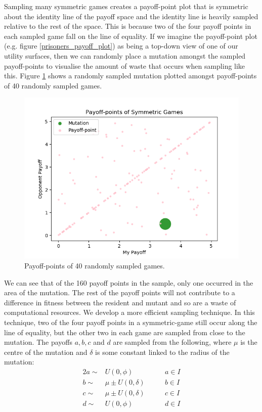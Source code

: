 \documentclass[11pt]{book}
\newcommand*{\np}{\par\noindent\newline}
\begin{document}
\np Sampling many symmetric games creates a payoff-point plot that is symmetric about the identity line of the payoff space and the identity line is heavily sampled relative to the rest of the space.
This is because two of the four payoff points in each sampled game fall on the line of equality.
If we imagine the payoff-point plot (e.g. figure \ref{prisoners_payoff_plot}) as being a top-down view of one of our utility surfaces,
then we can randomly place a mutation amongst the sampled payoff-points to visualise the amount of waste that occurs when sampling like this.
Figure \ref{symmetric_payoff_plot} shows a randomly sampled mutation plotted amongst payoff-points of 40 randomly sampled games.
\begin{figure}
	\centering
	\includegraphics[scale=0.7]{resources/scatter_symmetric_mutation.png}
	\caption{Payoff-points of 40 randomly sampled games.}
	\label{symmetric_payoff_plot}
\end{figure}
We can see that of the 160 payoff points in the sample, only one occurred in the area of the mutation.
The rest of the payoff points will not contribute to a difference in fitness between the resident and mutant and so are a waste of computational resources.
We develop a more efficient sampling technique.
In this technique, two of the four payoff points in a symmetric-game still occur along the line of equality,
but the other two in each game are sampled from close to the mutation.
The payoffs $a, b, c$ and $d$ are sampled from the following, where $\mu$ is the centre of the mutation and $\delta$ is some constant linked to the radius of the mutation:
\begin{alignat*}{2}\label{local_a_through_d}	
	a \sim & U(0,\phi) \qquad & a \in I\\
	b \sim & \mu \pm U(0,\delta) \qquad & b \in I\\
	c \sim & \mu \pm U(0,\delta) \qquad & c \in I\\
	d \sim & U(0,\phi) \qquad & d \in I
\end{alignat*}
\end{document}
